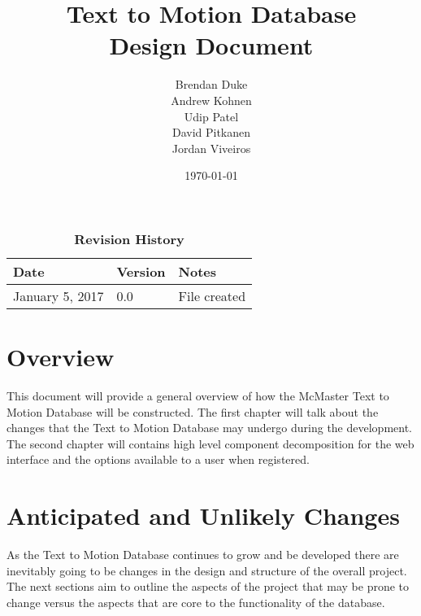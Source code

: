 \documentclass{scrreprt}
\begin{document}
\title{\bf Text to Motion Database\\[\baselineskip]\Large Design Document}
\author{Brendan Duke\\Andrew Kohnen\\Udip Patel\\David Pitkanen\\Jordan Viveiros}
\date{\today}
	
\maketitle

\tableofcontents


\begin{table}[bp]
\caption*{\bf Revision History}
\begin{tabularx}{\textwidth}{p{3.5cm}p{2cm}X}
\toprule {\bf Date} & {\bf Version} & {\bf Notes}\\
\midrule
January 5, 2017 & 0.0 & File created\\
\bottomrule
\end{tabularx}
\end{table}

\newpage


\chapter{Overview}
This document will provide a general overview of how the McMaster Text to Motion Database will be constructed. The first chapter will talk about the changes that the Text to Motion Database may undergo during the development. The second chapter will contains high level component decomposition for the web interface and the options available to a user when registered.

\chapter{Anticipated and Unlikely Changes}
As the Text to Motion Database continues to grow and be developed there are inevitably going to be changes in the design and structure of the overall project. The next sections aim to outline the aspects of the project that may be prone to change versus the aspects that are core to the functionality of the database.
\end{document}
